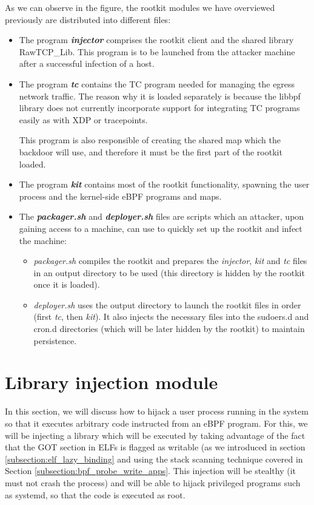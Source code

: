 As we can observe in the figure, the rootkit modules we have overviewed previously are distributed into different files:
\begin{itemize}
\item The program \textit{\textbf{injector}} comprises the rootkit client and the shared library RawTCP\_Lib. This program is to be launched from the attacker machine after a successful infection of a host.
\item The program \textit{\textbf{tc}} contains the TC program needed for managing the egress network traffic. The reason why it is loaded separately is because the libbpf library does not currently incorporate support for integrating TC programs easily as with XDP or tracepoints.

This program is also responsible of creating the shared map which the backdoor will use, and therefore it must be the first part of the rootkit loaded.
\item The program \textit{\textbf{kit}} contains most of the rootkit functionality, spawning the user process and the kernel-side eBPF programs and maps.
\item The \textit{\textbf{packager.sh}} and \textit{\textbf{deployer.sh}} files are scripts which an attacker, upon gaining access to a machine, can use to quickly set up the rootkit and infect the machine:
\begin{itemize}
	\item \textit{packager.sh} compiles the rootkit and prepares the \textit{injector}, \textit{kit} and \textit{tc} files in an output directory to be used (this directory is hidden by the rootkit once it is loaded).
	\item \textit{deployer.sh} uses the output directory to launch the rootkit files in order (first \textit{tc}, then \textit{kit}). It also injects the necessary files into the sudoers.d and cron.d directories (which will be later hidden by the rootkit) to maintain persistence.
\end{itemize}
\end{itemize}



\section{Library injection module} \label{section:lib_injection}
In this section, we will discuss how to hijack a user process running in the system so that it executes arbitrary code instructed from an eBPF program. For this, we will be injecting a library which will be executed by taking advantage of the fact that the GOT section in ELFs is flagged as writable (as we introduced in section \ref{subsection:elf_lazy_binding} and using the stack scanning technique covered in Section \ref{subsection:bpf_probe_write_apps}. This injection will be stealthy (it must not crash the process) and will be able to hijack privileged programs such as systemd, so that the code is executed as root.

